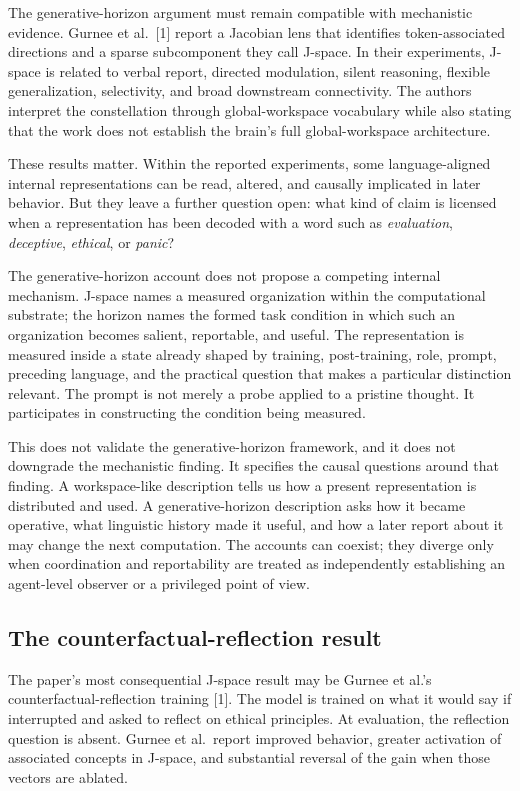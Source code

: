 \documentclass[12pt]{article}
\begin{document}
The generative-horizon argument must remain compatible with mechanistic evidence. Gurnee et al.~{[}1{]} report a Jacobian lens that identifies token-associated directions and a sparse subcomponent they call J-space. In their experiments, J-space is related to verbal report, directed modulation, silent reasoning, flexible generalization, selectivity, and broad downstream connectivity. The authors interpret the constellation through global-workspace vocabulary while also stating that the work does not establish the brain's full global-workspace architecture.

These results matter. Within the reported experiments, some language-aligned internal representations can be read, altered, and causally implicated in later behavior. But they leave a further question open: what kind of claim is licensed when a representation has been decoded with a word such as \emph{evaluation}, \emph{deceptive}, \emph{ethical}, or \emph{panic}?

The generative-horizon account does not propose a competing internal mechanism. J-space names a measured organization within the computational substrate; the horizon names the formed task condition in which such an organization becomes salient, reportable, and useful. The representation is measured inside a state already shaped by training, post-training, role, prompt, preceding language, and the practical question that makes a particular distinction relevant. The prompt is not merely a probe applied to a pristine thought. It participates in constructing the condition being measured.

This does not validate the generative-horizon framework, and it does not downgrade the mechanistic finding. It specifies the causal questions around that finding. A workspace-like description tells us how a present representation is distributed and used. A generative-horizon description asks how it became operative, what linguistic history made it useful, and how a later report about it may change the next computation. The accounts can coexist; they diverge only when coordination and reportability are treated as independently establishing an agent-level observer or a privileged point of view.

\subsection{The counterfactual-reflection result}\label{the-counterfactual-reflection-result}

The paper's most consequential J-space result may be Gurnee et al.'s counterfactual-reflection training {[}1{]}. The model is trained on what it would say if interrupted and asked to reflect on ethical principles. At evaluation, the reflection question is absent. Gurnee et al.~report improved behavior, greater activation of associated concepts in J-space, and substantial reversal of the gain when those vectors are ablated.
\end{document}
